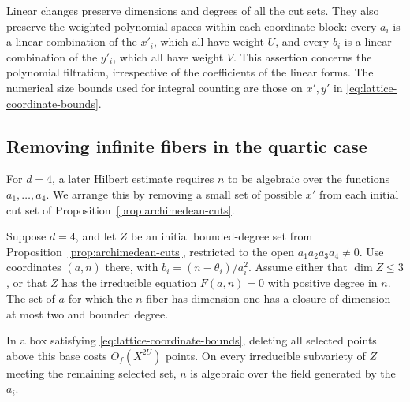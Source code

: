 Linear changes preserve dimensions and degrees of all the cut
sets. They also preserve the weighted polynomial spaces within
each coordinate block: every $a_i$ is a linear combination of
the $x'_i$, which all have weight $U$, and every $b_i$ is a linear
combination of the $y'_i$, which all have weight $V$.
This assertion concerns the polynomial filtration, irrespective
of the coefficients of the linear forms. The numerical size
bounds used for integral counting are those on $x',y'$ in
\eqref{eq:lattice-coordinate-bounds}.

\subsection{Removing infinite fibers in the quartic case}

For $d=4$, a later Hilbert estimate requires $n$ to be algebraic
over the functions $a_1,\ldots,a_4$. We arrange this by removing
a small set of possible $x'$ from each initial cut set of
Proposition~\ref{prop:archimedean-cuts}.

\begin{lemma}\label{lem:quartic-fibers}
Suppose $d=4$, and let $Z$ be an initial bounded-degree set from
Proposition~\ref{prop:archimedean-cuts}, restricted to the open
$a_1a_2a_3a_4\ne0$. Use coordinates
$(a,n)$ there, with $b_i=(n-\theta_i)/a_i^2$.
Assume either that $\dim Z\le3$, or that $Z$ has the irreducible
equation $F(a,n)=0$ with positive degree in $n$.
The set of $a$ for which the $n$-fiber has dimension one has a
closure of dimension at most two and bounded degree.

In a box satisfying \eqref{eq:lattice-coordinate-bounds}, deleting
all selected points above this base costs $O_f(X^{2U})$ points.
On every irreducible subvariety of $Z$ meeting the remaining
selected set, $n$ is algebraic over the field generated by the
$a_i$.
\end{lemma}

